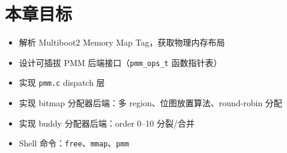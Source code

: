 \section{本章目标}

\begin{itemize}
  \item 解析 Multiboot2 Memory Map Tag，获取物理内存布局
  \item 设计可插拔 PMM 后端接口（\texttt{pmm\_ops\_t} 函数指针表）
  \item 实现 \texttt{pmm.c} dispatch 层
  \item 实现 bitmap 分配器后端：多 region、位图放置算法、round-robin 分配
  \item 实现 buddy 分配器后端：order 0--10 分裂/合并
  \item Shell 命令：\texttt{free}、\texttt{mmap}、\texttt{pmm}
\end{itemize}


